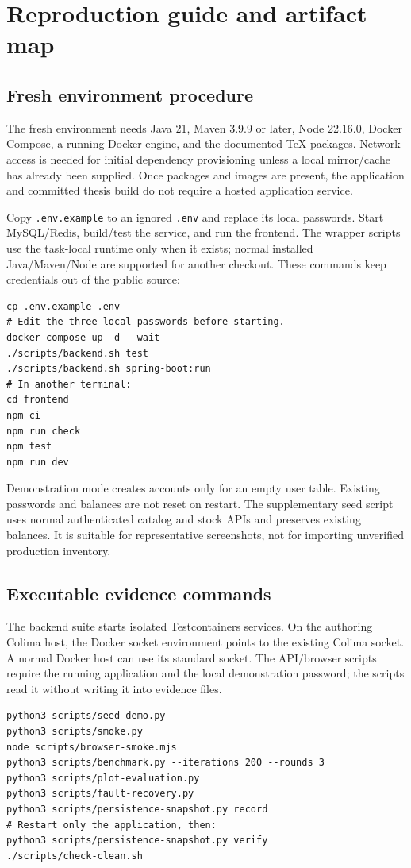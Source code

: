 \chapter{Reproduction guide and artifact map}
\section{Fresh environment procedure}
The fresh environment needs Java 21, Maven 3.9.9 or later, Node 22.16.0, Docker Compose, a running Docker engine, and the documented TeX packages. Network access is needed for initial dependency provisioning unless a local mirror/cache has already been supplied. Once packages and images are present, the application and committed thesis build do not require a hosted application service.

Copy \texttt{.env.example} to an ignored \texttt{.env} and replace its local passwords. Start MySQL/Redis, build/test the service, and run the frontend. The wrapper scripts use the task-local runtime only when it exists; normal installed Java/Maven/Node are supported for another checkout. These commands keep credentials out of the public source:
\begin{lstlisting}
cp .env.example .env
# Edit the three local passwords before starting.
docker compose up -d --wait
./scripts/backend.sh test
./scripts/backend.sh spring-boot:run
# In another terminal:
cd frontend
npm ci
npm run check
npm test
npm run dev
\end{lstlisting}

Demonstration mode creates accounts only for an empty user table. Existing passwords and balances are not reset on restart. The supplementary seed script uses normal authenticated catalog and stock APIs and preserves existing balances. It is suitable for representative screenshots, not for importing unverified production inventory.

\section{Executable evidence commands}
The backend suite starts isolated Testcontainers services. On the authoring Colima host, the Docker socket environment points to the existing Colima socket. A normal Docker host can use its standard socket. The API/browser scripts require the running application and the local demonstration password; the scripts read it without writing it into evidence files.
\begin{lstlisting}
python3 scripts/seed-demo.py
python3 scripts/smoke.py
node scripts/browser-smoke.mjs
python3 scripts/benchmark.py --iterations 200 --rounds 3
python3 scripts/plot-evaluation.py
python3 scripts/fault-recovery.py
python3 scripts/persistence-snapshot.py record
# Restart only the application, then:
python3 scripts/persistence-snapshot.py verify
./scripts/check-clean.sh
\end{lstlisting}

